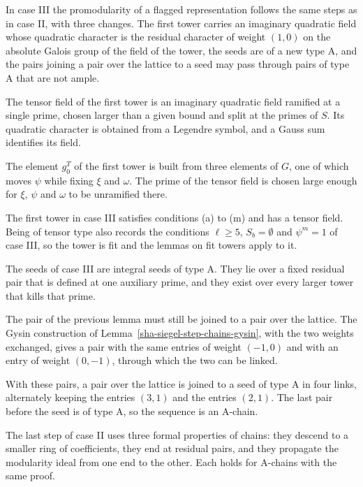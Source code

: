 In case III the promodularity of a flagged representation follows the same steps as in case II, with three changes. The first tower carries an imaginary quadratic field whose quadratic character is the residual character of weight $(1,0)$ on the absolute Galois group of the field of the tower, the seeds are of a new type A, and the pairs joining a pair over the lattice to a seed may pass through pairs of type A that are not ample.

The tensor field of the first tower is an imaginary quadratic field ramified at a single prime, chosen larger than a given bound and split at the primes of $S$. Its quadratic character is obtained from a Legendre symbol, and a Gauss sum identifies its field.

The element $g_0^T$ of the first tower is built from three elements of $G$, one of which moves $\psi$ while fixing $\xi$ and $\omega$. The prime of the tensor field is chosen large enough for $\xi$, $\psi$ and $\omega$ to be unramified there.

The first tower in case III satisfies conditions (a) to (m) and has a tensor field. Being of tensor type also records the conditions $\ell\ge5$, $S_b=\emptyset$ and $\psi^m=1$ of case III, so the tower is fit and the lemmas on fit towers apply to it.

The seeds of case III are integral seeds of type A. They lie over a fixed residual pair that is defined at one auxiliary prime, and they exist over every larger tower that kills that prime.

The pair of the previous lemma must still be joined to a pair over the lattice. The Gysin construction of Lemma~\ref{sha-siegel-step-chains-gysin}, with the two weights exchanged, gives a pair with the same entries of weight $(-1,0)$ and with an entry of weight $(0,-1)$, through which the two can be linked.

With these pairs, a pair over the lattice is joined to a seed of type A in four links, alternately keeping the entries $(3,1)$ and the entries $(2,1)$. The last pair before the seed is of type A, so the sequence is an A-chain.

The last step of case II uses three formal properties of chains: they descend to a smaller ring of coefficients, they end at residual pairs, and they propagate the modularity ideal from one end to the other. Each holds for A-chains with the same proof.

